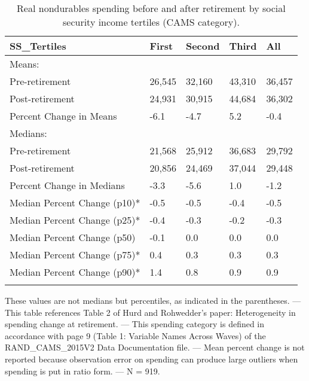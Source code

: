 \begin{table}[tbp] \centering
{}

\caption{Real nondurables spending before and after retirement by social security income tertiles (CAMS category).}
\begin{tabularx}{\textwidth}{lCCCC}

\toprule
{SS\_Tertiles}&{First}&{Second}&{Third}&{All} \tabularnewline
\midrule\addlinespace[1.5ex]
Means:&&&& \tabularnewline
\midrule Pre-retirement&26,545&32,160&43,310&36,457 \tabularnewline
Post-retirement&24,931&30,915&44,684&36,302 \tabularnewline
Percent Change in Means&-6.1&-4.7&5.2&-0.4 \tabularnewline
\midrule Medians:&&&& \tabularnewline
\midrule Pre-retirement&21,568&25,912&36,683&29,792 \tabularnewline
Post-retirement&20,856&24,469&37,044&29,448 \tabularnewline
Percent Change in Medians&-3.3&-5.6&1.0&-1.2 \tabularnewline
Median Percent Change (p10)*&-0.5&-0.5&-0.4&-0.5 \tabularnewline
Median Percent Change (p25)*&-0.4&-0.3&-0.2&-0.3 \tabularnewline
Median Percent Change (p50)&-0.1&0.0&0.0&0.0 \tabularnewline
Median Percent Change (p75)*&0.4&0.3&0.3&0.3 \tabularnewline
Median Percent Change (p90)*&1.4&0.8&0.9&0.9 \tabularnewline
\bottomrule \addlinespace[1.5ex]

\end{tabularx}
\begin{flushleft}
\footnotesize *These values are not medians but percentiles, as indicated in the parentheses. \linebreak --- \linebreak This table references Table 2 of Hurd and Rohwedder's paper: Heterogeneity in spending change at retirement. \linebreak --- \linebreak This spending category is defined in accordance with page 9 (Table 1: Variable Names Across Waves) of the RAND\_CAMS\_2015V2 Data Documentation file. \linebreak --- \linebreak Mean percent change is not reported because observation error on spending can produce large outliers when spending is put in ratio form. \linebreak --- \linebreak N = 919.
\end{flushleft}
\end{table}
